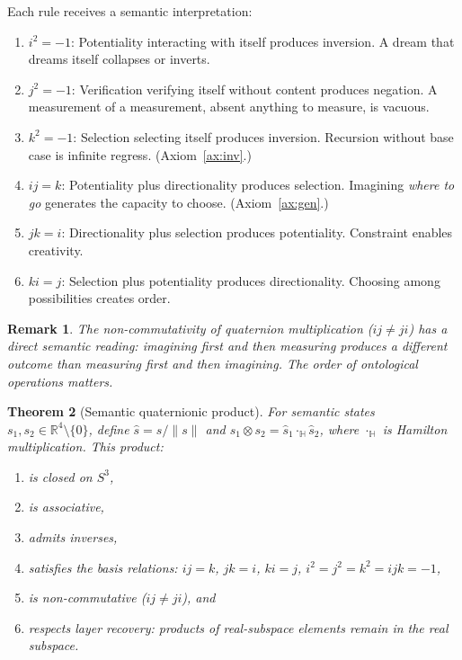 \documentclass[11pt,a4paper]{article}
\newtheorem{theorem}{Theorem}
\newtheorem{remark}[theorem]{Remark}
\newcommand{\imag}[1]{{\color{icolor}#1}}
\newcommand{\exac}[1]{{\color{jcolor}#1}}
\newcommand{\recu}[1]{{\color{kcolor}#1}}
\def\imag#1{#1}%
\def\exac#1{#1}%
\def\recu#1{#1}%
\begin{document}
Each rule receives a semantic interpretation:
\begin{enumerate}[nosep]
\item $\imag{i}^2 = -1$: Potentiality interacting with itself produces
  inversion. A dream that dreams itself collapses or inverts.
\item $\exac{j}^2 = -1$: Verification verifying itself without content
  produces negation. A measurement of a measurement, absent anything to
  measure, is vacuous.
\item $\recu{k}^2 = -1$: Selection selecting itself produces inversion.
  Recursion without base case is infinite regress. (Axiom~\ref{ax:inv}.)
\item $\imag{i}\exac{j} = \recu{k}$: Potentiality plus directionality
  produces selection. Imagining \emph{where to go} generates the
  capacity to choose. (Axiom~\ref{ax:gen}.)
\item $\exac{j}\recu{k} = \imag{i}$: Directionality plus selection
  produces potentiality. Constraint enables creativity.
\item $\recu{k}\imag{i} = \exac{j}$: Selection plus potentiality
  produces directionality. Choosing among possibilities creates order.
\end{enumerate}

\begin{remark}
The non-commutativity of quaternion multiplication
($\imag{i}\exac{j} \neq \exac{j}\imag{i}$) has a direct semantic
reading: imagining first and then measuring produces a different outcome
than measuring first and then imagining. The order of ontological
operations matters.
\end{remark}

\begin{theorem}[Semantic quaternionic product]
\label{thm:quat_product}
For semantic states $s_1,s_2\in\mathbb{R}^4\setminus\{0\}$,
define $\hat{s}=s/\|s\|$ and
$s_1\otimes s_2=\hat{s}_1\cdot_{\mathbb{H}}\hat{s}_2$,
where $\cdot_{\mathbb{H}}$ is Hamilton multiplication.
This product:
\begin{enumerate}[nosep]
  \item is closed on $S^3$,
  \item is associative,
  \item admits inverses,
  \item satisfies the basis relations: $ij=k$, $jk=i$, $ki=j$, $i^2=j^2=k^2=ijk=-1$,
  \item is non-commutative ($ij \neq ji$), and
  \item respects layer recovery: products of real-subspace elements remain in the real subspace.
\end{enumerate}
\end{theorem}
\end{document}
